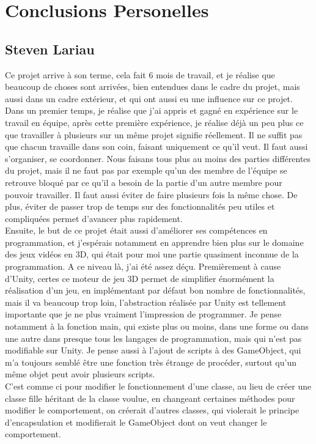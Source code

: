 \documentclass[12pt]{article}
\begin{document}
\section{Conclusions Personelles}

\subsection{Steven Lariau}

Ce projet arrive à son terme, cela fait 6 mois de travail, et je réalise que beaucoup de choses sont arrivées, bien entendues dans le cadre du projet, mais aussi dans un cadre extérieur, et qui ont aussi eu une influence sur ce projet.\\
Dans un premier temps, je réalise que j'ai appris et gagné en expérience sur le travail en équipe, après cette première expérience, je réalise déjà un peu plus ce que travailler à plusieurs sur un même projet signifie réellement. Il ne suffit pas que chacun travaille dans son coin, faisant uniquement ce qu'il veut. Il faut aussi s'organiser, se coordonner. Nous faisans tous plus au moins des parties différentes du projet, mais il ne faut pas par exemple qu'un des membre de l'équipe se retrouve bloqué par ce qu'il a besoin de la partie d'un autre membre pour pouvoir travailler. Il faut aussi éviter de faire plusieurs fois la même chose. De plus, éviter de passer trop de temps sur des fonctionnalités peu utiles et compliquées permet d'avancer plus rapidement.\\

Ensuite, le but de ce projet était aussi d'améliorer ses compétences en programmation, et j'espérais notamment en apprendre bien plus sur le domaine des jeux vidéos en 3D, qui était pour moi une partie quasiment inconnue de la programmation. A ce niveau là, j'ai été assez déçu. Premièrement à cause d'Unity, certes ce moteur de jeu 3D permet de simplifier énormément la réalisation d'un jeu, en implémentant par défaut bon nombre de fonctionnalités, mais il va beaucoup trop loin, l'abstraction réalisée par Unity est tellement importante que je ne plus vraiment l'impression de programmer. Je pense notamment à la fonction \gls{main}, qui existe plus ou moins, dans une forme ou dans une autre dans presque tous les langages de programmation, mais qui n'est pas modifiable sur Unity. Je pense aussi à l'ajout de scripts à des \gls{GameObject}, qui m'a toujours semblé être une fonction très étrange de procéder, surtout qu'un même objet peut avoir plusieurs scripts.\\
C'est comme ci pour modifier le fonctionnement d'une classe, au lieu de créer une classe fille héritant de la classe voulue, en changeant certaines méthodes pour modifier le comportement, on créerait d'autres classes, qui violerait le principe d'encapsulation et modifierait le GameObject dont on veut changer le comportement.\\
\end{document}
